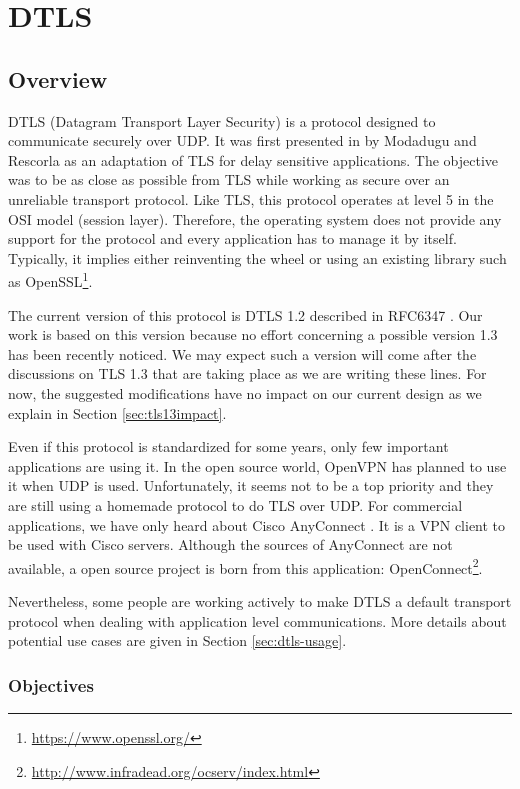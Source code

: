 \chapter{DTLS}\label{chap:dtls}


\section{Overview}

DTLS (Datagram Transport Layer Security) is a protocol designed to communicate securely over UDP. It was first presented in \cite{modadugu2004design} by Modadugu and Rescorla as an adaptation of TLS for delay sensitive applications. The objective was to be as close as possible from TLS while working as secure over an unreliable transport protocol. Like TLS, this protocol operates at level 5 in the OSI model (session layer). Therefore, the operating system does not provide any support for the protocol and every application has to manage it by itself. Typically, it implies either reinventing the wheel or using an existing library such as OpenSSL\footnote{\url{https://www.openssl.org/}}.

The current version of this protocol is DTLS 1.2 described in RFC6347 \cite{rfc6347}. Our work is based on this version because no effort concerning a possible version 1.3 has been recently noticed. We may expect such a version will come after the discussions on TLS 1.3 that are taking place as we are writing these lines. For now, the suggested modifications have no impact on our current design as we explain in Section \ref{sec:tls13impact}.

Even if this protocol is standardized for some years, only few important applications are using it. In the open source world, OpenVPN has planned to use it when UDP is used. Unfortunately, it seems not to be a top priority and they are still using a homemade protocol to do TLS over UDP. For commercial applications, we have only heard about Cisco AnyConnect \cite{anyconnect}. It is a VPN client to be used with Cisco servers. Although the sources of AnyConnect are not available, a open source project is born from this application: OpenConnect\footnote{\url{http://www.infradead.org/ocserv/index.html}}.

Nevertheless, some people are working actively to make DTLS a default transport protocol when dealing with application level communications. More details about potential use cases are given in Section \ref{sec:dtls-usage}.

\subsection{Objectives}

